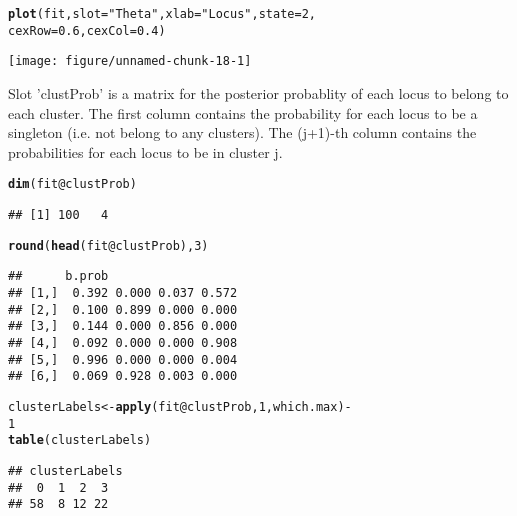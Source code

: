 \documentclass[a4paper,10pt]{article}\usepackage[]{graphicx}\usepackage[]{color}
\makeatletter
\def\maxwidth{ %
  \ifdim\Gin@nat@width>\linewidth
    \linewidth
  \else
    \Gin@nat@width
  \fi
}
\newcommand{\hlnum}[1]{\textcolor[rgb]{0.686,0.059,0.569}{#1}}%
\newcommand{\hlstr}[1]{\textcolor[rgb]{0.192,0.494,0.8}{#1}}%
\newcommand{\hlopt}[1]{\textcolor[rgb]{0,0,0}{#1}}%
\newcommand{\hlstd}[1]{\textcolor[rgb]{0.345,0.345,0.345}{#1}}%
\newcommand{\hlkwb}[1]{\textcolor[rgb]{0.69,0.353,0.396}{#1}}%
\newcommand{\hlkwc}[1]{\textcolor[rgb]{0.333,0.667,0.333}{#1}}%
\newcommand{\hlkwd}[1]{\textcolor[rgb]{0.737,0.353,0.396}{\textbf{#1}}}%
\newenvironment{kframe}{%
 \def\at@end@of@kframe{}%
 \ifinner\ifhmode%
  \def\at@end@of@kframe{\end{minipage}}%
  \begin{minipage}{\columnwidth}%
 \fi\fi%
 \def\FrameCommand##1{\hskip\@totalleftmargin \hskip-\fboxsep
 \colorbox{shadecolor}{##1}\hskip-\fboxsep
     \hskip-\linewidth \hskip-\@totalleftmargin \hskip\columnwidth}%
 \MakeFramed {\advance\hsize-\width
   \@totalleftmargin\z@ \linewidth\hsize
   \@setminipage}}%
 {\par\unskip\endMakeFramed%
 \at@end@of@kframe}
\newenvironment{knitrout}{}{} %
\makeatother
\begin{document}
\begin{knitrout}
\color{fgcolor}\begin{kframe}
\begin{alltt}
\hlkwd{plot}\hlstd{(fit,} \hlkwc{slot} \hlstd{=} \hlstr{"Theta"}\hlstd{,} \hlkwc{xlab} \hlstd{=} \hlstr{"Locus"}\hlstd{,} \hlkwc{state} \hlstd{=} \hlnum{2}\hlstd{,}
    \hlkwc{cexRow} \hlstd{=} \hlnum{0.6}\hlstd{,} \hlkwc{cexCol} \hlstd{=} \hlnum{0.4}\hlstd{)}
\end{alltt}
\end{kframe}

{\centering \texttt{[image: figure/unnamed-chunk-18-1]} 

}



\end{knitrout}

Slot 'clustProb' is a matrix for the posterior probablity of each locus to belong to each cluster. The first column contains the probability for each locus to be a singleton (i.e. not belong to any clusters). The (j+1)-th column contains the probabilities for each locus to be in cluster j.

\begin{knitrout}
\color{fgcolor}\begin{kframe}
\begin{alltt}
\hlkwd{dim}\hlstd{(fit}\hlopt{@}\hlkwc{clustProb}\hlstd{)}
\end{alltt}
\begin{verbatim}
## [1] 100   4
\end{verbatim}
\begin{alltt}
\hlkwd{round}\hlstd{(}\hlkwd{head}\hlstd{(fit}\hlopt{@}\hlkwc{clustProb}\hlstd{),} \hlnum{3}\hlstd{)}
\end{alltt}
\begin{verbatim}
##      b.prob                  
## [1,]  0.392 0.000 0.037 0.572
## [2,]  0.100 0.899 0.000 0.000
## [3,]  0.144 0.000 0.856 0.000
## [4,]  0.092 0.000 0.000 0.908
## [5,]  0.996 0.000 0.000 0.004
## [6,]  0.069 0.928 0.003 0.000
\end{verbatim}
\begin{alltt}
\hlstd{clusterLabels} \hlkwb{<-} \hlkwd{apply}\hlstd{(fit}\hlopt{@}\hlkwc{clustProb}\hlstd{,} \hlnum{1}\hlstd{, which.max)} \hlopt{-}
    \hlnum{1}
\hlkwd{table}\hlstd{(clusterLabels)}
\end{alltt}
\begin{verbatim}
## clusterLabels
##  0  1  2  3 
## 58  8 12 22
\end{verbatim}
\end{kframe}
\end{knitrout}
\end{document}
